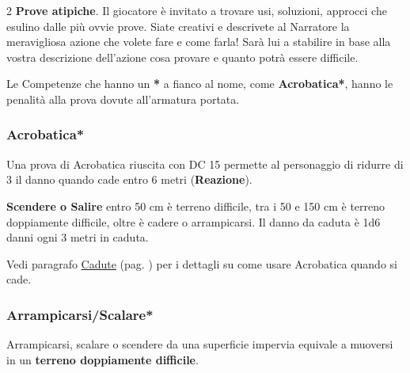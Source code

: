 \begin{multicols}{2}
\textbf{Prove atipiche}. Il giocatore è invitato a trovare usi, soluzioni, approcci che esulino dalle più ovvie prove. Siate creativi e descrivete al Narratore la meravigliosa azione che volete fare e come farla! Sarà lui a stabilire in base alla vostra descrizione dell'azione cosa provare e quanto potrà essere difficile.

Le Competenze che hanno un \textbf{*} a fianco al nome, come \textbf{Acrobatica*}, hanno le penalità alla prova dovute all'armatura portata.

\titlespacing*{\subsubsection}{0pt}{0.5em}{0.5em}\subsubsection*{Acrobatica*} \label{acrobatica}
Una prova di Acrobatica riuscita con DC 15 permette al personaggio di ridurre di 3 il danno quando cade entro 6 metri (\textbf{Reazione}).

\textbf{Scendere o Salire} entro 50 cm è terreno difficile, tra i 50 e 150 cm è terreno doppiamente difficile, oltre è cadere o arrampicarsi. Il danno da caduta è 1d6 danni ogni 3 metri in caduta. 

Vedi paragrafo \hyperlink{cadute}{Cadute} (pag. \pageref{cadute}) per i dettagli su come usare Acrobatica quando si cade.

\titlespacing*{\subsubsection}{0pt}{0.5em}{0.5em}\subsubsection*{Arrampicarsi/Scalare*} \label{arrampicarsi}\hypertarget{arrampicarsi}{}

Arrampicarsi, scalare o scendere da una superficie impervia equivale a muoversi in un \textbf{terreno doppiamente difficile}.

\medskip


\end{multicols}
